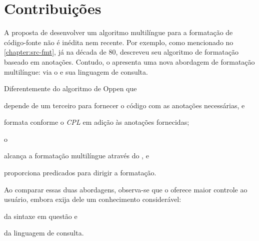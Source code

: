 \documentclass
  [11pt,a4paper,english,brazil,openright,sumario=tradicional,twoside]
  {abntex2}
\begin{document}

  \section{Contribuições}

  A proposta de desenvolver um algoritmo multilíngue para a formatação de
  código-fonte não é inédita nem recente. Por exemplo, como mencionado no
  \cref{chapter:src-fmt}, já na década de 80,
  \textcite{oppen-1980-prettyprinting} descreveu seu algoritmo de formatação
  baseado em anotações. Contudo, o \witchcooking apresenta uma nova abordagem
  de formatação multilíngue: via o \treesitter e sua linguagem de consulta.

  Diferentemente do algoritmo de Oppen que
  \begin{inparaenum}
    \item depende de um terceiro para fornecer o código com as anotações
          necessárias, e
    \item formata conforme o \textit{CPL} em adição às anotações fornecidas;
  \end{inparaenum}
  o \witchcooking
  \begin{inparaenum}
    \item alcança a formatação multilíngue através do \treesitter, e
    \item proporciona predicados para dirigir a formatação.
  \end{inparaenum}
  Ao comparar essas duas abordagens, observa-se que o \witchcooking oferece
  maior controle ao usuário, embora exija dele um conhecimento considerável:
  \begin{inparaenum}
    \item da sintaxe em questão e
    \item da linguagem de consulta.
  \end{inparaenum}
\end{document}
